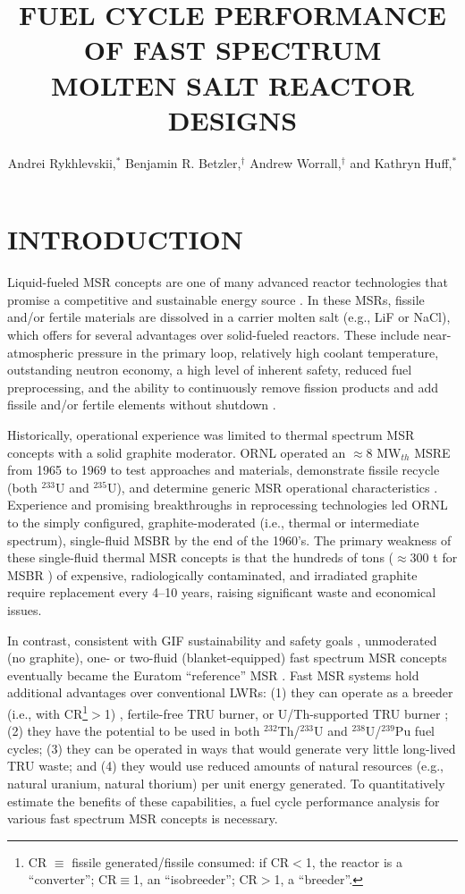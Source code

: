 \documentclass{anstrans}
\title{FUEL CYCLE PERFORMANCE OF FAST SPECTRUM \\
  MOLTEN SALT REACTOR DESIGNS}
\author{Andrei Rykhlevskii,$^{*}$ Benjamin R. Betzler,$^{\dagger}$ Andrew Worrall,$^{\dagger}$ and Kathryn Huff,$^{*}$}
\institute{
$^{*}$Dept. of Nuclear, Plasma, and Radiological Engineering, University of Illinois at 
  Urbana-Champaign, Urbana, IL \\ andreir2@illinois.edu
\and
$^{\dagger}$Oak Ridge National Laboratory, 1 Bethel Valley Road, Oak Ridge, TN, USA
}
\begin{document}
\section{INTRODUCTION} 
\label{sec:intro}
Liquid-fueled \gls{MSR} concepts are one of many advanced reactor technologies that promise a competitive and sustainable energy source \cite{siemer_why_2015}. In these \gls{MSR}s, fissile and/or fertile materials are dissolved in a carrier molten salt (e.g., LiF or NaCl), which offers for several advantages over solid-fueled reactors. These include near-atmospheric pressure in the primary loop, relatively high coolant temperature, outstanding neutron economy, a high level of inherent safety,
reduced fuel preprocessing, and the ability to continuously remove fission products and add fissile and/or fertile elements without shutdown \cite{leblanc_molten_2010}. 

Historically, operational experience was limited to thermal spectrum \gls{MSR} concepts with a solid graphite moderator.  \gls{ORNL} operated an $\approx$8 MW$_{th}$ \gls{MSRE} from 1965 to 1969 to test approaches and materials, demonstrate fissile recycle (both $^{233}$U and $^{235}$U), and determine generic \gls{MSR} operational characteristics \cite{macpherson_molten_1985}. Experience and promising breakthroughs in reprocessing technologies \cite{whatley_engineering_1970} led \gls{ORNL} to the simply configured, graphite-moderated (i.e., thermal or intermediate spectrum), single-fluid \gls{MSBR} by the end of the 1960's. The primary weakness of these single-fluid thermal \gls{MSR} concepts is that the hundreds of tons ($\approx$300 t for \gls{MSBR} \cite{robertson_conceptual_1971}) of expensive, radiologically contaminated, and irradiated graphite require replacement every 4--10 years, raising significant waste and economical issues.

In contrast, consistent with \gls{GIF} sustainability and safety goals \cite{gif_generation_2015}, unmoderated (no graphite), one- or two-fluid (blanket-equipped) fast spectrum \gls{MSR} concepts eventually became the Euratom ``reference'' \gls{MSR} \cite{noauthor_final_2015}. Fast \gls{MSR} systems hold additional advantages over conventional \glspl{LWR}: 
(1) they can operate as a breeder (i.e., with \gls{CR}\footnote{\gls{CR} $\equiv$ fissile generated/fissile consumed: if CR$<$1, the reactor is a ``converter''; CR$\equiv$1, an ``isobreeder''; CR$>$1, a ``breeder''.}$>$1) \cite{noauthor_final_2015,simmons_assessment_1974,mourogov_potentialities_2006}, fertile-free \gls{TRU} burner, or U/Th-supported \gls{TRU} burner \cite{ignatiev_progress_2007}; 
(2) they have the potential to be used in both $^{232}$Th/$^{233}$U and $^{238}$U/$^{239}$Pu fuel cycles; 
(3) they can be operated in ways that would generate very little long-lived \gls{TRU} waste; and 
(4) they would use reduced amounts of natural resources (e.g., natural uranium, natural thorium) per unit energy generated. To quantitatively estimate the benefits of these capabilities, a fuel cycle performance analysis for various fast spectrum \gls{MSR} concepts is necessary.
\end{document}
